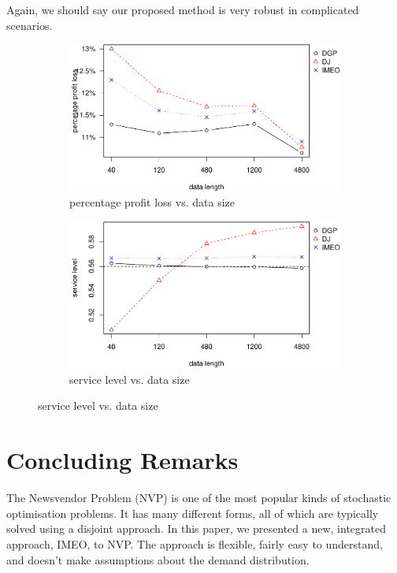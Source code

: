 \documentclass{article}
\begin{document}
Again, we should say our proposed method is very robust in complicated scenarios.

\begin{figure}[ht]
\centering
\caption{Performance vs. sample size with Laplace distributed error term nonlinear model}
\begin{subfigure}[b]{0.48\textwidth}
\centering
\includegraphics[width=\textwidth]{runif_non-plot_files/figure-latex/ppl-1.pdf}
\caption{percentage profit loss vs. data size}
\end{subfigure}
\hfill
\begin{subfigure}[b]{0.48\textwidth}
\centering
\includegraphics[width=\textwidth]{runif_non-plot_files/figure-latex/sl-1.pdf}
\caption{service level vs. data size}
\end{subfigure}
\label{fig:err_non}
\end{figure}

\section{Concluding Remarks} \label{se:end}

The Newsvendor Problem (NVP) is one of the most popular kinds of stochastic optimisation problems. It has many different forms, all of which are typically solved using a disjoint approach. In this paper, we presented a new, integrated approach, IMEO, to NVP. The approach is flexible, fairly easy to understand, and doesn't make assumptions about the demand distribution.
\end{document}
